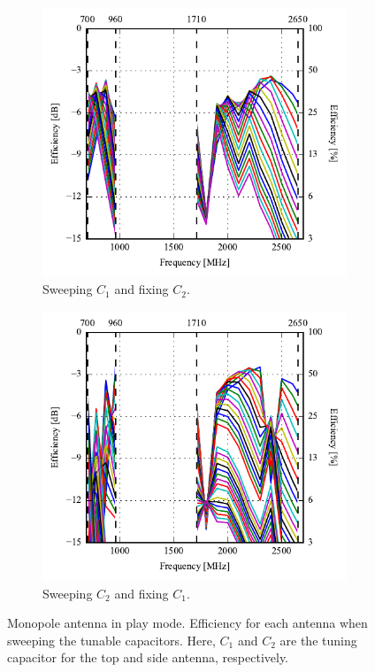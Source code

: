\begin{figure}[htbp]
    \centering
    \begin{subfigure}{0.49\linewidth}
        \includegraphics{img/tech_sol/monopole/highband/ue/playmode/eff_top.pdf}
        \caption{Sweeping $C_1$ and fixing $C_2$.}
    \end{subfigure}
    \hfill
    \begin{subfigure}{0.49\linewidth}
        \includegraphics{img/tech_sol/monopole/highband/ue/playmode/eff_side.pdf}
        \caption{Sweeping $C_2$ and fixing $C_1$.}
    \end{subfigure}
    \caption{Monopole antenna in play mode. Efficiency for each antenna when sweeping the tunable capacitors. Here, $C_1$ and $C_2$ are the tuning capacitor for the top and side antenna, respectively.}
    \label{fig:eff_mono_modi_play_mode}
\end{figure}

